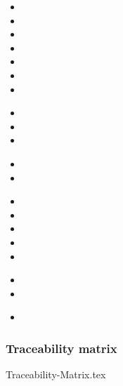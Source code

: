 \textbf{}

\begin{itemize}

	\item {}
	\item {}
	\item {}
	\item {}
	\item {}
	\item {}
	\item {}
\end{itemize}

\begin{itemize}
	\item {}
	\item {}
	\item {}
\end{itemize}


\textbf{}

\begin{itemize}

	\item {}
	\item {}
\end{itemize}

\begin{itemize}

	\item {}
	\item {}
	\item {}
	\item {}
	\item {}
\end{itemize}


\textbf{}

\begin{itemize}

	\item {}
	\item {}
\end{itemize}

\begin{itemize}

	\item {}
\end{itemize}

\subsubsection{Traceability matrix}
{Traceability-Matrix.tex}
